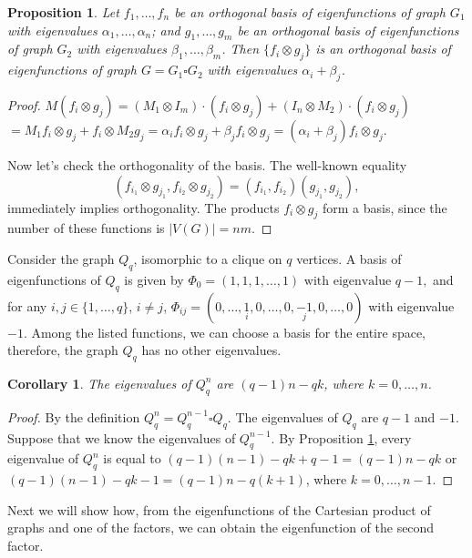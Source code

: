 \documentclass[11pt]{article}
\newtheorem{claim}{Proposition}[section]
\newtheorem{corollary}{Corollary}[section]
\theoremstyle{definition}
\begin{document}
\begin{claim}\label{c:direct_product_eigen}
Let $f_1,\ldots,f_n$ be an orthogonal basis of eigenfunctions of graph $G_1$ with eigenvalues
$\alpha_1,\ldots,\alpha_n$; and $g_1,\ldots,g_m$ be an orthogonal basis of eigenfunctions of graph $G_2$ with eigenvalues
$\beta_1,\ldots,\beta_m$. Then $\{f_i\otimes g_j\}$ is an orthogonal basis of eigenfunctions of graph $G=G_1\square G_2$
with eigenvalues $\alpha_i+\beta_j$. \end{claim}
\begin{proof}

$M(f_i\otimes g_j) = (M_1 \otimes I_{m})\cdot(f_i\otimes g_j) +
(I_{n} \otimes M_2)\cdot(f_i\otimes g_j)$ \\ $=M_1f_i\otimes
g_j+f_i\otimes M_2g_j=\alpha_i f_i\otimes g_j+\beta_j f_i\otimes
g_j=(\alpha_i+\beta_j)f_i\otimes g_j.$

Now let's check the orthogonality of the basis. The well-known equality
\[
(f_{i_1}\otimes g_{j_1},
 f_{i_2}\otimes g_{j_2})
=
(f_{i_1},f_{i_2})
(g_{j_1},g_{j_2}),
\]
 immediately implies orthogonality.
The products $f_{i}\otimes g_{j}$ form a basis, since
the number of these functions is $|V(G)|=nm$.
\end{proof}


Consider the graph $Q_q$, isomorphic to a clique on $q$ vertices. A basis of  eigenfunctions of $Q_q$ is given by
$
\Phi_0=(1,1,1,\ldots,1)\mbox{  with eigenvalue } q-1,
$
and for any $i,j\in\{1,\dots,q\}$, $i\neq j$,
$
\Phi_{ij}=(0,\dots,\underset i{1},0,\dots,0,\underset
j{-1},0,\ldots,0)
$
 with eigenvalue $-1$.
Among the listed functions, we can choose a basis for the entire space,
therefore, the graph $Q_q$ has no other eigenvalues.


\begin{corollary}\label{cl:spec}
The eigenvalues of $Q^n_q$ are $(q-1)n-qk$, where $k=0,\dots,n$.
\end{corollary} 
\begin{proof}
By the definition  $Q^n_q=Q^{n-1}_q\square Q_q$.  The eigenvalues of  $Q_q$ are $q-1$ and $-1$.
Suppose that we know the eigenvalues of $Q^{n-1}_q$. By Proposition \ref{c:direct_product_eigen},   every eigenvalue of $Q^n_q$ is equal to $(q-1)(n-1)-qk+q-1=(q-1)n-qk$ or  $(q-1)(n-1)-qk-1=(q-1)n-q(k+1)$, where $k=0,\dots,n-1$.
\end{proof}

Next we will show how, from the eigenfunctions of the Cartesian product of graphs and
one of the factors, we can obtain the eigenfunction of the second
factor.
\end{document}
